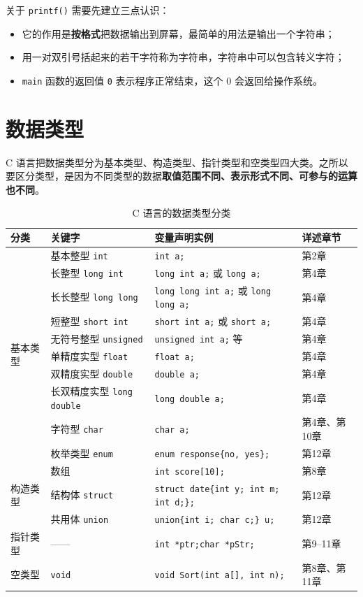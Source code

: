 关于 \texttt{printf()} 需要先建立三点认识：

\begin{itemize}
  \item 它的作用是\textbf{按格式}把数据输出到屏幕，最简单的用法是输出一个字符串；
  \item 用一对双引号括起来的若干字符称为字符串，字符串中可以包含转义字符；
  \item \texttt{main} 函数的返回值 \texttt{0} 表示程序正常结束，这个 0 会返回给操作系统。
\end{itemize}

\section{数据类型}

C 语言把数据类型分为基本类型、构造类型、指针类型和空类型四大类。之所以要区分类型，是因为不同类型的数据\textbf{取值范围不同、表示形式不同、可参与的运算也不同}。

\begin{table}[htbp]
\centering
\caption{C 语言的数据类型分类}
\footnotesize
\setlength{\tabcolsep}{4pt}
\begin{tabularx}{\textwidth}{@{}p{1.7cm}p{2.4cm}Xp{1.5cm}@{}}
\toprule
分类 & 关键字 & 变量声明实例 & 详述章节 \\
\midrule
\multirow{10}{*}{基本类型}
 & 基本整型 \texttt{int} & \texttt{int a;} & 第2章 \\
 & 长整型 \texttt{long int} & \texttt{long int a;} 或 \texttt{long a;} & 第4章 \\
 & 长长整型 \texttt{long long} & \texttt{long long int a;} 或 \texttt{long long a;} & 第4章 \\
 & 短整型 \texttt{short int} & \texttt{short int a;} 或 \texttt{short a;} & 第4章 \\
 & 无符号整型 \texttt{unsigned} & \texttt{unsigned int a;} 等 & 第4章 \\
\cmidrule(l){2-4}
 & 单精度实型 \texttt{float} & \texttt{float a;} & 第4章 \\
 & 双精度实型 \texttt{double} & \texttt{double a;} & 第4章 \\
 & 长双精度实型 \texttt{long double} & \texttt{long double a;} & 第4章 \\
\cmidrule(l){2-4}
 & 字符型 \texttt{char} & \texttt{char a;} & 第4章、第10章 \\
 & 枚举类型 \texttt{enum} & \texttt{enum response\{no, yes\};} & 第12章 \\
\midrule
\multirow{3}{*}{构造类型}
 & 数组 & \texttt{int score[10];} & 第8章 \\
 & 结构体 \texttt{struct} & \texttt{struct date\{int y; int m; int d;\};} & 第12章 \\
 & 共用体 \texttt{union} & \texttt{union\{int i; char c;\} u;} & 第12章 \\
\midrule
指针类型 & —— & \texttt{int *ptr;}\quad \texttt{char *pStr;} & 第9--11章 \\
空类型 & \texttt{void} & \texttt{void Sort(int a[], int n);} & 第8章、第11章 \\
\bottomrule
\end{tabularx}
\end{table}

